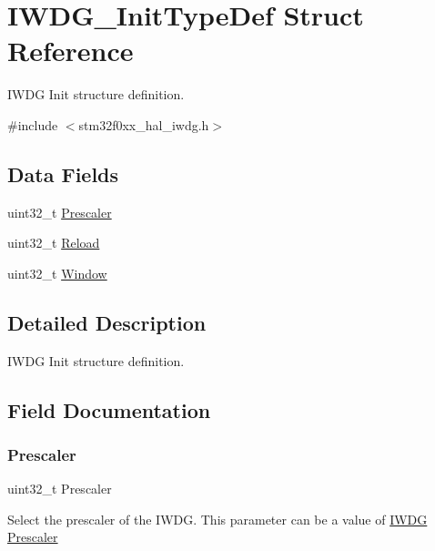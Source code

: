 \hypertarget{struct_i_w_d_g___init_type_def}{}\section{I\+W\+D\+G\+\_\+\+Init\+Type\+Def Struct Reference}
\label{struct_i_w_d_g___init_type_def}


I\+W\+DG Init structure definition.  




{\ttfamily \#include $<$stm32f0xx\+\_\+hal\+\_\+iwdg.\+h$>$}

\subsection*{Data Fields}
\begin{DoxyCompactItemize}
\item 
uint32\+\_\+t \hyperlink{struct_i_w_d_g___init_type_def_affb82025da5b8d4a06e61f1690460f4d}{Prescaler}
\item 
uint32\+\_\+t \hyperlink{struct_i_w_d_g___init_type_def_ac1853930373a5a969bec345ba2810360}{Reload}
\item 
uint32\+\_\+t \hyperlink{struct_i_w_d_g___init_type_def_a0ea3a5767370dd42e6108643f23d5c68}{Window}
\end{DoxyCompactItemize}


\subsection{Detailed Description}
I\+W\+DG Init structure definition. 

\subsection{Field Documentation}
\mbox{\label{struct_i_w_d_g___init_type_def_affb82025da5b8d4a06e61f1690460f4d}} 
\subsubsection{\texorpdfstring{Prescaler}{Prescaler}}
{\footnotesize\ttfamily uint32\+\_\+t Prescaler}

Select the prescaler of the I\+W\+DG. This parameter can be a value of \hyperlink{group___i_w_d_g___prescaler}{I\+W\+DG Prescaler} \mbox{\label{struct_i_w_d_g___init_type_def_ac1853930373a5a969bec345ba2810360}} 
